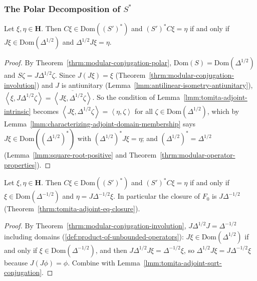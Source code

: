 \subsubsection{The Polar Decomposition of $S^*$}

\begin{lemma}[$S^* = \Delta^{1/2}J$]
    \label{lmm:tomita-adjoint-sqrt-conjugation}
    \leanok
    Let $\xi, \eta \in \mathbf{H}$. Then $C\xi \in \text{Dom}((S')^*)$ and $(S')^*C\xi = \eta$ if and only if $J\xi \in \text{Dom}(\Delta^{1/2})$ and $\Delta^{1/2}J\xi = \eta$.
\end{lemma}
\begin{proof}
    \leanok
    By Theorem~\ref{thrm:modular-conjugation-polar}, $\text{Dom}(S) = \text{Dom}(\Delta^{1/2})$ and $S\zeta = J\Delta^{1/2}\zeta$. Since $J(J\xi) = \xi$ (Theorem~\ref{thrm:modular-conjugation-involution}) and $J$ is antiunitary (Lemma~\ref{lmm:antilinear-isometry-antiunitary}), $\left< \xi, J\Delta^{1/2}\zeta \right> = \overline{\left< J\xi, \Delta^{1/2}\zeta \right>}$. So the condition of Lemma~\ref{lmm:tomita-adjoint-intrinsic} becomes $\left< J\xi, \Delta^{1/2}\zeta \right> = \left< \eta, \zeta \right>$ for all $\zeta \in \text{Dom}(\Delta^{1/2})$, which by Lemma~\ref{lmm:characterizing-adjoint-domain-membership} says $J\xi \in \text{Dom}((\Delta^{1/2})^*)$ with $(\Delta^{1/2})^*J\xi = \eta$; and $(\Delta^{1/2})^* = \Delta^{1/2}$ (Lemma~\ref{lmm:square-root-positive} and Theorem~\ref{thrm:modular-operator-properties}).
\end{proof}

\begin{corollary}[$S^* = J\Delta^{-1/2}$]
    \label{crllr:tomita-adjoint-polar}
    \leanok
    Let $\xi, \eta \in \mathbf{H}$. Then $C\xi \in \text{Dom}((S')^*)$ and $(S')^*C\xi = \eta$ if and only if $\xi \in \text{Dom}(\Delta^{-1/2})$ and $\eta = J\Delta^{-1/2}\xi$. In particular the closure of $F_0$ is $J\Delta^{-1/2}$ (Theorem~\ref{thrm:tomita-adjoint-eq-closure}).
\end{corollary}
\begin{proof}
    \leanok
    By Theorem~\ref{thrm:modular-conjugation-involution}, $J\Delta^{1/2}J = \Delta^{-1/2}$ including domains (\ref{def:product-of-unbounded-operators}): $J\xi \in \text{Dom}(\Delta^{1/2})$ if and only if $\xi \in \text{Dom}(\Delta^{-1/2})$, and then $J\Delta^{1/2}J\xi = \Delta^{-1/2}\xi$, so $\Delta^{1/2}J\xi = J\Delta^{-1/2}\xi$ because $J(J\phi) = \phi$. Combine with Lemma~\ref{lmm:tomita-adjoint-sqrt-conjugation}.
\end{proof}

